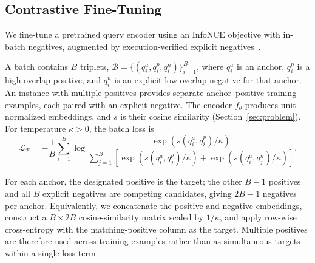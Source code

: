 \documentclass[runningheads]{llncs}
\begin{document}
\FloatBarrier
\subsection{Contrastive Fine-Tuning}
\label{sec:objective}

We fine-tune a pretrained query encoder using an InfoNCE objective with
in-batch negatives, augmented by execution-verified explicit
negatives~\cite{oord2018cpc,karpukhin2020dpr}.

A batch contains $B$ triplets,
$\mathcal{B}=\{(q_i^a,q_i^p,q_i^n)\}_{i=1}^{B}$, where $q_i^a$ is an
anchor, $q_i^p$ is a high-overlap positive, and $q_i^n$ is an explicit
low-overlap negative for that anchor. An instance with multiple positives
provides separate anchor--positive training examples, each paired with
an explicit negative. The encoder $f_\theta$ produces unit-normalized
embeddings, and $s$ is their cosine similarity
(Section~\ref{sec:problem}). For temperature $\kappa>0$, the batch loss is
\begin{equation}
\mathcal{L}_{\mathcal{B}}
=
-\frac{1}{B}\sum_{i=1}^{B}
\log
\frac{
  \exp\!\left(s(q_i^a,q_i^p)/\kappa\right)
}{
  \displaystyle\sum_{j=1}^{B}
  \left[
    \exp\!\left(s(q_i^a,q_j^p)/\kappa\right)
    +
    \exp\!\left(s(q_i^a,q_j^n)/\kappa\right)
  \right]
}.
\label{eq:loss}
\end{equation}

For each anchor, the designated positive is the target; the other $B-1$
positives and all $B$ explicit negatives are competing candidates, giving
$2B-1$ negatives per anchor. Equivalently, we concatenate the positive and
negative embeddings, construct a $B\times 2B$ cosine-similarity matrix
scaled by $1/\kappa$, and apply row-wise cross-entropy with the
matching-positive column as the target. Multiple positives are therefore
used across training examples rather than as simultaneous targets within a
single loss term.
\end{document}
